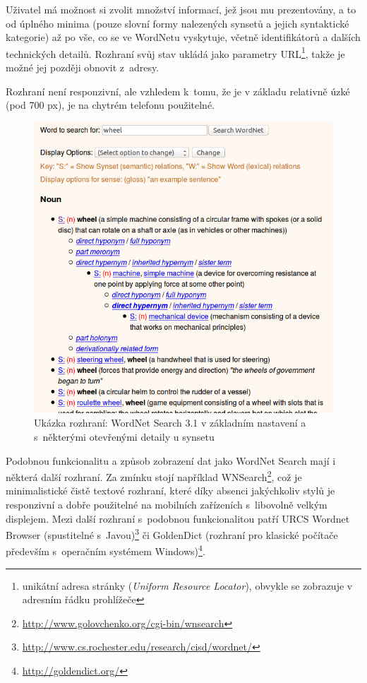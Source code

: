 \documentclass[a4paper, 11pt, oneside, showtrims]{book}
\begin{document}
					Uživatel má možnost si zvolit množství informací, jež jsou mu prezentovány, a to od úplného minima (pouze slovní formy nalezených synsetů a jejich syntaktické kategorie) až po vše, co se ve WordNetu vyskytuje, včetně identifikátorů a dalších technických detailů. Rozhraní svůj stav ukládá jako parametry URL\footnote{unikátní adresa stránky (\textit{Uniform Resource Locator}), obvykle se zobrazuje v adresním řádku prohlížeče}, takže je možné jej později obnovit z~adresy.

					Rozhraní není responzivní, ale vzhledem k~tomu, že je v základu relativně úzké (pod 700 px), je na chytrém telefonu použitelné.

					\begin{figure}[h]
						\centering
						\includegraphics[width=1.0\textwidth]{wnsearch.png}
						\caption{Ukázka rozhraní: WordNet Search 3.1 v základním nastavení a s~některými otevřenými detaily u synsetu}
						\label{fig:wnsearch}
					\end{figure}

					Podobnou funkcionalitu a způsob zobrazení dat jako WordNet Search mají i některá další rozhraní. Za zmínku stojí například WNSearch\footnote{\url{http://www.golovchenko.org/cgi-bin/wnsearch}}, což je minimalistické čistě textové rozhraní, které díky absenci jakýchkoliv stylů je responzivní a dobře použitelné na mobilních zařízeních s~libovolně velkým displejem. Mezi další rozhraní s~podobnou funkcionalitou patří URCS Wordnet Browser (spustitelné s~Javou)\footnote{\url{http://www.cs.rochester.edu/research/cisd/wordnet/}} či GoldenDict (rozhraní pro klasické počítače především s~operačním systémem Windows)\footnote{\url{http://goldendict.org/}}.
\end{document}
